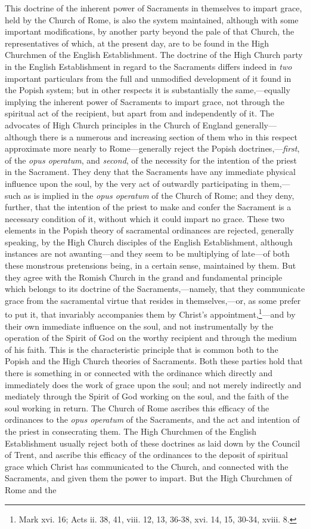 \documentclass[]{book}
\begin{document}
This doctrine of the inherent power of Sacraments in themselves to impart grace, held by the Church of Rome, is also the system maintained, although with some important modifications, by another party beyond the pale of that Church, the representatives of which, at the present day, are to be found in the High Churchmen of the English Establishment. The doctrine of the High Church party in the English Establishment in regard to the Sacraments differs indeed in \emph{two} important particulars from the full and unmodified development of it found in the Popish system; but in other respects it is substantially the same,---equally implying the inherent power of Sacraments to impart grace, not through the spiritual act of the recipient, but apart from and independently of it. The advocates of High Church principles in the Church of England generally---although there is a numerous and increasing section of them who in this respect approximate more nearly to Rome---generally reject the Popish doctrines,---\emph{first}, of the \emph{opus operatum}, and \emph{second}, of the necessity for the intention of the priest in the Sacrament. They deny that the Sacraments have any immediate physical influence upon the soul, by the very act of outwardly participating in them,---such as is implied in the \emph{opus operatum} of the Church of Rome; and they deny, further, that the intention of the priest to make and confer the Sacrament is a necessary condition of it, without which it could impart no grace. These two elements in the Popish theory of sacramental ordinances are rejected, generally speaking, by the High Church disciples of the English Establishment, although instances are not awanting---and they seem to be multiplying of late---of both these monstrous pretensions being, in a certain sense, maintained by them. But they agree with the Romish Church in the grand and fundamental principle which belongs to its doctrine of the Sacraments,---namely, that they communicate grace from the sacramental virtue that resides in themselves,---or, as some prefer to put it, that invariably accompanies them by Christ's appointment,\footnote{Mark xvi. 16; Acts ii. 38, 41, viii. 12, 13, 36-38, xvi. 14, 15, 30-34, xviii. 8.}---and by their own immediate influence on the soul, and not instrumentally by the operation of the Spirit of God on the worthy recipient and through the medium of his faith. This is the characteristic principle that is common both to the Popish and the High Church theories of Sacraments. Both these parties hold that there is something in or connected with the ordinance which directly and immediately does the work of grace upon the soul; and not merely indirectly and mediately through the Spirit of God working on the soul, and the faith of the soul working in return. The Church of Rome ascribes this efficacy of the ordinances to the \emph{opus operatum} of the Sacraments, and the act and intention of the priest in consecrating them. The High Churchmen of the English Establishment usually reject both of these doctrines as laid down by the Council of Trent, and ascribe this efficacy of the ordinances to the deposit of spiritual grace which Christ has communicated to the Church, and connected with the Sacraments, and given them the power to impart. But the High Churchmen of Rome and the 
\end{document}
